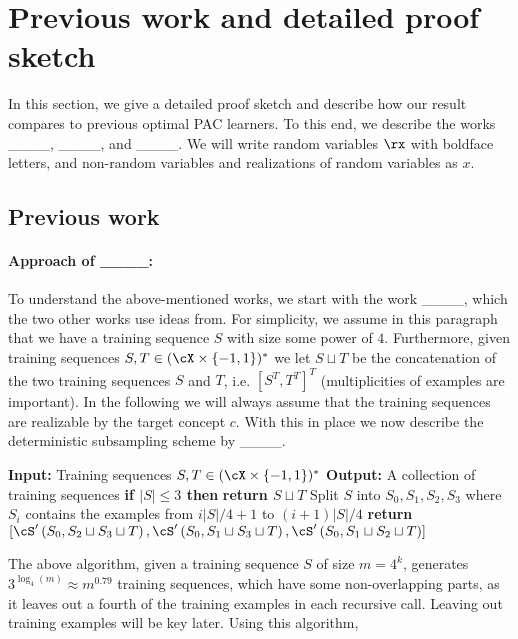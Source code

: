 \section{Previous work and detailed proof sketch}
\label{sec:proofoverview}

In this section, we give a detailed proof sketch and describe how our result compares to previous optimal PAC learners. To this end, we describe the works ____, ____, and ____. We will write random variables  $ \rx $ with boldface letters, and non-random variables and realizations of random variables as $ x $. 
\subsection{Previous work} 
\paragraph{Approach of ____:}
To understand the above-mentioned works, we start with the work ____, which the two other works use ideas from. For simplicity, we assume in this paragraph that we have a training sequence $ S $ with size some power of $4$. Furthermore, given training sequences $S,T\in (\cX \times \{-1,1\})^{*}$ we let $ S\sqcup T $ be the concatenation of the two training sequences $ S $ and $ T $, i.e.   $ [S^{T},T^{T}]^{T} $ (multiplicities of examples are important). In the following we will always assume that the training sequences are realizable by the target concept $ c.$  With this in place we now describe the deterministic subsampling scheme by ____. 
\begin{algorithm}[H]
  \caption{$\cS'(S,T)$}\label{alg:Subsamplehanneke}
  \begin{algorithmic}[1]
    \State \textbf{Input:} Training sequences $S ,T\in (\cX\times \{-1,1\})^{*}$ 
    \State \textbf{Output:}{ A collection of training sequences}
      \State \textbf{if $ |S|\leq 3 $ then}
      \State\hspace{0.5cm}\textbf{return $ S\sqcup T $ }
      \State Split $ S $ into  $S_0,S_{1},S_{2},S_{3}$  where $ S_i $ contains the examples from $i|S|/4+1$ to $ (i+1)|S|/4$
      \State \textbf{return}$[\cS'\left(S_0 , S_2 \sqcup S_3 \sqcup T\right) , \cS'\left(S_0 , S_1 \sqcup S_3 \sqcup T\right) , \cS'\left(S_0 , S_1 \sqcup S_2 \sqcup T\right)]$
  \end{algorithmic} 
\end{algorithm}
\vspace{-0.3cm}
The above algorithm, given a training sequence $S$ of size $m=4^{k}$, generates $3^{\log_{4}(m)}\approx m^{0.79}$ training sequences, which have some non-overlapping parts, as it leaves out a fourth of the training examples in each recursive call. Leaving out training examples will be key later. Using this algorithm, 

